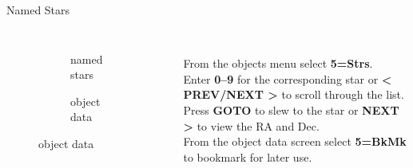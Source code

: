\begin{frame}[t]{Named Stars}
  \begin{columns}[T]
    \begin{figure}[ht]
        \begin{subfigure}{0.67\textwidth}
        \caption{named stars}
      \end{subfigure}
      \vspace{\fill}
      \begin{subfigure}{0.67\textwidth}
        \caption{object data}
      \end{subfigure}
    \end{figure}
  \large
  \ \\[0.25ex]
  From the objects menu select \textbf{5=Strs}.\\[1ex]

  Enter \textbf{0--9} for the corresponding star or \textbf{\textless
  PREV/NEXT \textgreater} to scroll through the list. \\[1ex]

  Press \textbf{GOTO} to slew to the star or \textbf{NEXT \textgreater} to
  view the RA and Dec. \\[1ex]

  From the object data screen select \textbf{5=BkMk} to bookmark for later
  use.

\end{columns}
\end{frame}


